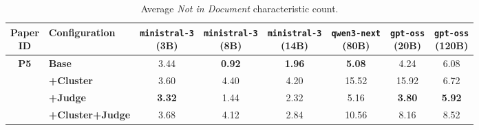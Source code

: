 \begin{table}[htbp]
    \centering
    \small
    \setlength{\tabcolsep}{4pt}
    \caption{Average \textit{Not in Document} characteristic count.}
    \begin{tabular}{c|l|cccccc}
        \toprule
        \makecell{\textbf{Paper} \\ \textbf{ID}} & \textbf{Configuration}& \makecell{\texttt{ministral-3} \\ (3B)} & \makecell{\texttt{ministral-3} \\ (8B)} & \makecell{\texttt{ministral-3} \\ (14B)} & \makecell{\texttt{qwen3-next} \\ (80B)} & \makecell{\texttt{gpt-oss} \\ (20B)} & \makecell{\texttt{gpt-oss} \\ (120B)} \\
        \hline
        
        \multirow{4}{*}{\textbf{P5}} 
          & \textbf{Base}& 3.44 & \textbf{0.92} & \textbf{1.96} & \textbf{5.08} & 4.24 & 6.08 \\
          & \textbf{+Cluster}& 3.60 & 4.40 & 4.20 & 15.52 & 15.92 & 6.72 \\
          & \textbf{+Judge}& \textbf{3.32} & 1.44 & 2.32 & 5.16 & \textbf{3.80} & \textbf{5.92} \\
          & \textbf{+Cluster+Judge}& 3.68 & 4.12 & 2.84 & 10.56 & 8.16 & 8.52 \\
        \hline
        
        \bottomrule
    \end{tabular}
    \label{tab:not_in_doc_p5}
\end{table}